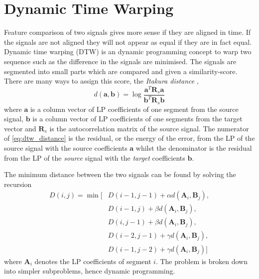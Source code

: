 \section{Dynamic Time Warping} %
\label{sec:dynamic_time_warping}
Feature comparison of two signals gives more sense if they are aligned in time. If the signals are not aligned they will not appear as equal if they are in fact equal. Dynamic time warping (DTW) is an dynamic programming concept to warp two sequence such as the difference in the signals are minimised. The signals are segmented into small parts which are compared and given a similarity-score. There are many ways to assign this score, \eg the \emph{Itakura distance} \cite{itakura90},
\begin{equation}
	\label{eq:dtw_distance}
		d(\mathbf{a},\mathbf{b}) = \log\frac{\mathbf{a}^T \mathbf{R}_s \mathbf{a}}{\mathbf{b}^T \mathbf{R}_s \mathbf{b}}
\end{equation}
where $\mathbf{a}$ is a column vector of LP coefficients of one segment from the source signal, $\mathbf{b}$ is a column vector of LP coefficients of one segments from the target vector and $\mathbf{R}_s$ is the autocorrelation matrix of the source signal. The numerator of \eqref{eq:dtw_distance} is the residual, or the energy of the error, from the LP of the source signal with the source coefficients $\mathbf{a}$ whilst the denominator is the residual from the LP of the \emph{source} signal with the \emph{target} coefficients $\mathbf{b}$. 

The minimum distance between the two signals can be found by solving the recursion \cite{taletek}
\begin{equation}
	\label{eq:dtw_recursion}
	\begin{split}
		D(i,j) = \min \bigl[&D(i-1,j-1)+\alpha d(\mathbf{A}_i,\mathbf{B}_j),\\
		& D(i-1,j)+\beta d(\mathbf{A}_i,\mathbf{B}_j),\\
		& D(i,j-1)+\beta d(\mathbf{A}_i,\mathbf{B}_j),\\
		& D(i-2,j-1)+\gamma d(\mathbf{A}_i,\mathbf{B}_j),\\
		& D(i-1,j-2)+\gamma d(\mathbf{A}_i,\mathbf{B}_j)\bigr]		
	\end{split}
\end{equation}
where $\mathbf{A}_i$ denotes the LP coefficients of segment $i$. 
The problem is broken down into simpler subproblems, hence dynamic programming. 

